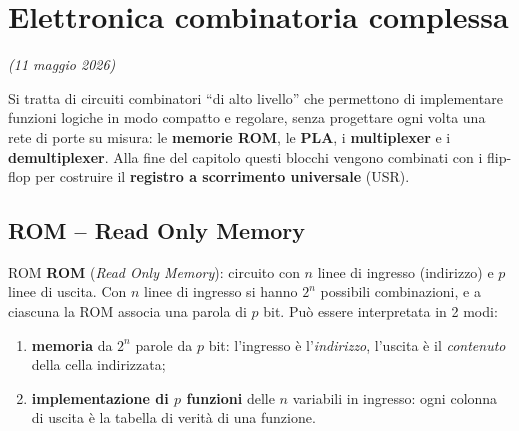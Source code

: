 \chapter{Elettronica combinatoria complessa}
\label{ch:comb-complessa}
\textit{(11 maggio 2026)}

\noindent Si tratta di circuiti combinatori ``di alto livello'' che permettono di
implementare funzioni logiche in modo compatto e regolare, senza progettare ogni volta una
rete di porte su misura: le \textbf{memorie ROM}, le \textbf{PLA}, i \textbf{multiplexer} e
i \textbf{demultiplexer}. Alla fine del capitolo questi blocchi vengono combinati con i
flip-flop per costruire il \textbf{registro a scorrimento universale} (USR).

\section{ROM -- Read Only Memory}

\begin{definizione}{ROM}
\textbf{ROM} (\emph{Read Only Memory}): circuito con $n$ linee di ingresso (indirizzo) e $p$
linee di uscita. Con $n$ linee di ingresso si hanno $2^n$ possibili combinazioni, e a
ciascuna la ROM associa una parola di $p$ bit. Può essere interpretata in 2 modi:
\begin{enumerate}[leftmargin=1.5em]
    \item \textbf{memoria} da $2^n$ parole da $p$ bit: l'ingresso è l'\emph{indirizzo}, l'uscita
          è il \emph{contenuto} della cella indirizzata;
    \item \textbf{implementazione di $p$ funzioni} delle $n$ variabili in ingresso: ogni
          colonna di uscita è la tabella di verità di una funzione.
\end{enumerate}
\end{definizione}

\begin{center}
\end{center}

